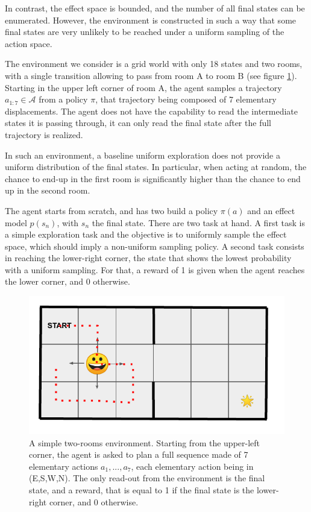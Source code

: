 \documentclass[runningheads]{llncs}
\begin{document}
In contrast, the effect space is bounded, and the number of all final states can be enumerated. However, the environment is constructed in such a way that some final states are very unlikely to be reached under a uniform sampling of the action space.


The environment we consider is a grid world with only 18 states and two rooms, with a single transition allowing to pass from room A to room B (see figure \ref{fig:grid1}). Starting in the upper left corner of room A, the agent samples a trajectory $a_{1:7} \in \mathcal{A}$ from a policy $\pi$, that trajectory being composed of 7 elementary displacements. The agent does not have the capability to read the intermediate states it is passing through, it can only read the final state after the full trajectory is realized. 
    
In such an environment, a baseline uniform exploration does not provide a uniform distribution of the final states. In particular, when acting at random, the chance to end-up in the first room is significantly higher than the chance to end up in the second room.  
    
The agent starts from scratch, and has two build a policy $\pi(a)$ and an effect model $p(s_n)$, with $s_n$ the final state. 
There are two task at hand. A first task is a simple exploration task and the objective is to uniformly sample the effect space, which should imply a non-uniform sampling policy. A second task consists in reaching the lower-right corner, the state that shows the lowest probability with a uniform sampling. For that, a reward of 1 is given when the agent reaches the lower corner, and 0 otherwise.

\begin{figure}[t]\label{fig:grid1}
\centerline{
	\includegraphics[width = .7 \linewidth]{../figures/env-1.pdf} 
}
\caption{A simple two-rooms environment. Starting from the upper-left corner, the agent is asked to plan a full sequence made of 7 elementary actions $a_1,...,a_7$, each elementary action being in (E,S,W,N). The only read-out from the environment is the final state, and a reward, that is equal to 1 if the final state is the lower-right corner, and 0 otherwise.}
\end{figure}
\end{document}
